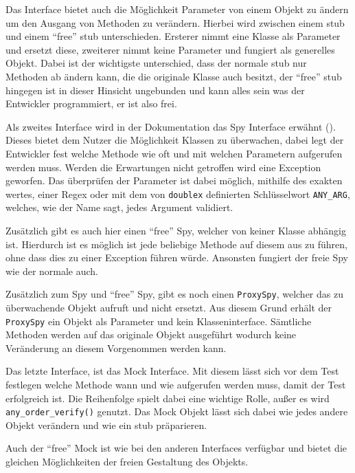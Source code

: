 Das Interface bietet auch die Möglichkeit Parameter von einem Objekt zu ändern
um den Ausgang von Methoden zu verändern. Hierbei wird zwischen einem \Gls{stub}
und einem "`free"' \Gls{stub} unterschieden. Ersterer nimmt eine Klasse als
Parameter und ersetzt diese, zweiterer nimmt keine Parameter und fungiert als
generelles Objekt. Dabei ist der wichtigste unterschied, dass der normale
\Gls{stub} nur Methoden ab ändern kann, die die originale Klasse auch besitzt,
der "`free"' \Gls{stub} hingegen ist in dieser Hinsicht ungebunden und kann
alles sein was der Entwickler programmiert, er ist also frei.
\newline

Als zweites Interface wird in der Dokumentation das Spy Interface erwähnt
(\cite{doublex:docs:1.8.1}). Dieses bietet dem Nutzer die Möglichkeit Klassen zu
überwachen, dabei legt der Entwickler fest welche Methode wie oft und mit
welchen Parametern aufgerufen werden muss. Werden die Erwartungen nicht
getroffen wird eine Exception geworfen. Das überprüfen der Parameter ist dabei
möglich, mithilfe des exakten wertes, einer Regex oder mit dem von
\lstinline{doublex} definierten Schlüsselwort \lstinline{ANY_ARG}, welches, wie
der Name sagt, jedes Argument validiert.

Zusätzlich gibt es auch hier einen "`free"' Spy, welcher von keiner
Klasse abhängig ist. Hierdurch ist es möglich ist jede beliebige Methode auf
diesem aus zu führen, ohne dass dies zu einer Exception führen würde. Ansonsten
fungiert der freie Spy wie der normale auch.
\newline

Zusätzlich zum Spy und "`free"' Spy, gibt es noch einen \lstinline{ProxySpy},
welcher das zu überwachende Objekt aufruft und nicht ersetzt. Aus diesem Grund
erhält der \lstinline{ProxySpy} ein Objekt als Parameter und kein
Klasseninterface. Sämtliche Methoden werden auf das originale Objekt ausgeführt
wodurch keine Veränderung an diesem Vorgenommen werden kann.
\newline

Das letzte Interface, ist das Mock Interface. Mit diesem lässt sich vor dem Test
festlegen welche Methode wann und wie aufgerufen werden muss, damit der Test
erfolgreich ist. Die Reihenfolge spielt dabei eine wichtige Rolle, außer es wird
\lstinline{any_order_verify()} genutzt. Das Mock Objekt lässt sich dabei wie
jedes andere Objekt verändern und wie ein \Gls{stub} präparieren.

Auch der "`free"' Mock ist wie bei den anderen Interfaces verfügbar und bietet
die gleichen Möglichkeiten der freien Gestaltung des Objekts.
\newline

